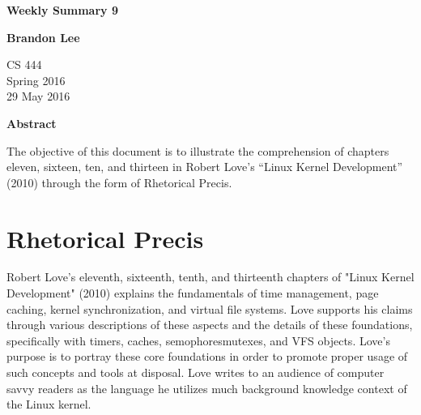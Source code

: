 \documentclass[letterpaper,10pt,titlepage]{article}
\begin{document}
\begin{titlepage}
    \begin{center}
        \vspace*{3.5cm}

        \textbf{Weekly Summary 9}

        \vspace{0.5cm}

        \textbf{Brandon Lee}

        \vspace{0.8cm}

        CS 444\\
        Spring 2016\\
        29 May 2016\\

        \vspace{1cm}

        \textbf{Abstract}\\

        \vspace{0.5cm}

        The objective of this document is to illustrate the comprehension of chapters eleven, sixteen, ten, and thirteen in Robert Love's “Linux Kernel Development” (2010) through the form of Rhetorical Precis.

        \vfill

    \end{center}
\end{titlepage}

\newpage

\section{Rhetorical Precis}

Robert Love's eleventh, sixteenth, tenth, and thirteenth chapters of "Linux Kernel Development" (2010) explains the fundamentals of time management, page caching, kernel synchronization, and virtual file systems.  Love supports his claims through various descriptions of these aspects and the details of these foundations, specifically with timers, caches, semophores\/mutexes, and VFS objects.  Love's purpose is to portray these core foundations in order to promote proper usage of such concepts and tools at disposal.  Love writes to an audience of computer savvy readers as the language he utilizes much background knowledge context of the Linux kernel.
\end{document}
